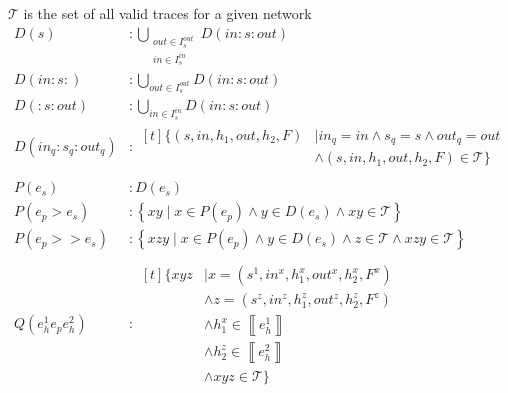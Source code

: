 \documentclass[preview]{standalone}
\begin{document}
$\mathcal{T}$ is the set of all valid traces for a given network
\begin{align*}
	D(s) &: \bigcup_{\substack{out \in I^{out}_s \\in \in I^{in}_s}}D(in : s : out)
		\\
	D(in : s :) &: \bigcup_{out \in I^{out}_s}D(in : s : out)
		\\
	D(: s : out) &: \bigcup_{in \in I^{in}_s}D(in : s : out)
		\\
		D(in_q : s_q : out_q) &: 
		\begin{aligned}[t]
			\bigl\{ (s, in, h_1, out, h_2, F) &\mid{}
			in_q = in \wedge{} s_q = s \wedge{} out_q = out \\
			&\wedge{} (s, in, h_1, out, h_2, F) \in{} \mathcal{T} \bigr\}
		\end{aligned}
		\\
		\\
	P(e_s) &: D(e_s)
		\\
	P(e_p > e_s) &: \left\{ xy \mid x \in P(e_p) \wedge{} y \in{}
		D(e_s) \wedge{} xy \in{} \mathcal{T} \right\}
		\\
	P(e_p >> e_s) &: \left\{ xzy \mid{} x \in{} P(e_p) \wedge{} y \in{}
		D(e_s) \wedge{} z \in{} \mathcal{T} \wedge{} xzy \in{} \mathcal{T}
		\right\}
		\\
		\\
		Q(e_h^1 e_p e_h^2) &: 
		\begin{aligned}[t]
			\bigl\{ xyz &\mid{}
			x = (s^1, in^x, h_1^x, out^x, h_2^x, F^x)\\
			&\wedge{}z = (s^z, in^z, h_1^z, out^z, h_2^z, F^z)\\
			&\wedge{} h_1^x \in \left\llbracket e_h^1 \right\rrbracket\\
			&\wedge{} h_2^z \in \left\llbracket e_h^2 \right\rrbracket\\
			&\wedge{} xyz \in \mathcal{T}
			\bigr\}
		\end{aligned}
\end{align*}
\end{document}
